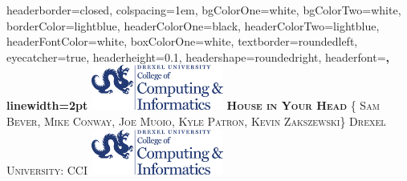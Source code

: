 \documentclass[landscape,a0paper,fontscale=0.285]{baposter} %
\begin{document}
\begin{poster}
{
headerborder=closed, %
colspacing=1em, %
bgColorOne=white, %
bgColorTwo=white, %
borderColor=lightblue, %
headerColorOne=black, %
headerColorTwo=lightblue, %
headerFontColor=white, %
boxColorOne=white, %
textborder=roundedleft, %
eyecatcher=true, %
headerheight=0.1\textheight, %
headershape=roundedright, %
headerfont=\Large\bf\textsc, %
linewidth=2pt %
}
%
{\includegraphics[height=4em]{drexel.png}} %
{\bf\textsc{House in Your Head}\vspace{0.5em}} %
{\textsc{\{ Sam Bever, Mike Conway, Joe Muoio, Kyle Patron, Kevin Zakszewski\} \hspace{12pt} Drexel University: CCI}} %
{\includegraphics[height=4em]{drexel.png}} %



\end{poster}
\end{document}
